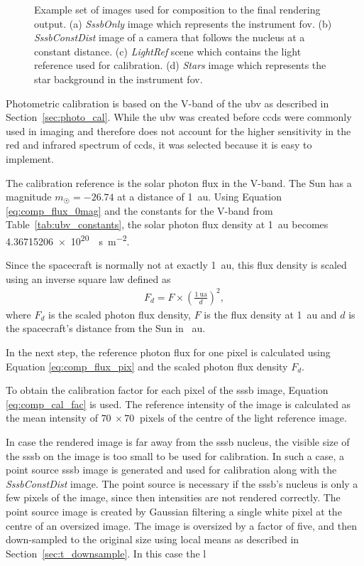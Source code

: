 \begin{figure}[htb]
\begin{subfigure}[b]{0.47\textwidth}
        \caption{}
        \label{fig:comp_stars}
    \end{subfigure}
    \caption{Example set of images used for composition to the final rendering output. (a) \textit{SssbOnly} image which represents the instrument \gls{fov}. (b) \textit{SssbConstDist} image of a camera that follows the nucleus at a constant distance. (c) \textit{LightRef} scene which contains the light reference used for calibration. (d) \textit{Stars} image which represents the star background in the instrument \gls{fov}.}
    \label{fig:comp_imageset}
\end{figure}

Photometric calibration is based on the V-band of the \gls{ubv} as described in Section~\ref{sec:photo_cal}. While the \gls{ubv} was created before \glspl{ccd} were commonly used in imaging and therefore does not account for the higher sensitivity in the red and infrared spectrum of \glspl{ccd}, it was selected because it is easy to implement.

The calibration reference is the solar photon flux in the V-band. The Sun has a magnitude $m_{\astrosun} = -26.74$ at a distance of \SI{1}{\astronomicalunit}. Using Equation \ref{eq:comp_flux_0mag} and the constants for the V-band from Table~\ref{tab:ubv_constants}, the solar photon flux density at \SI{1}{\astronomicalunit} becomes \SI{4.36715206e+20}{\per\second\per\square\meter}.
 
Since the spacecraft is normally not at exactly \SI{1}{\astronomicalunit}, this flux density is scaled using an inverse square law defined as
\begin{align}
    F_d = F \times \left(\frac{\SI{1}{\astronomicalunit}}{d}\right)^2, \label{eq:inverse_square}
\end{align}
where $F_d$ is the scaled photon flux density, $F$ is the flux density at \SI{1}{\astronomicalunit} and $d$ is the spacecraft's distance from the Sun in \SI{}{\astronomicalunit}.

In the next step, the reference photon flux for one pixel is calculated using Equation \ref{eq:comp_flux_pix} and the scaled photon flux density $F_d$.

To obtain the calibration factor for each pixel of the \gls{sssb} image, Equation \ref{eq:comp_cal_fac} is used. The reference intensity of the image is calculated as the mean intensity of $\SI{70}{}\times\SI{70}{}$ pixels of the centre of the light reference image.

In case the rendered image is far away from the \gls{sssb} nucleus, the visible size of the \gls{sssb} on the image is too small to be used for calibration. In such a case, a point source \gls{sssb} image is generated and used for calibration along with the \textit{SssbConstDist} image. The point source is necessary if the \gls{sssb}'s nucleus is only a few pixels of the image, since then intensities are not rendered correctly. The point source image is created by Gaussian filtering a single white pixel at the centre of an oversized image. The image is oversized by a factor of five, and then down-sampled to the original size using local means as described in Section~\ref{sec:t_downsample}. In this case the l

